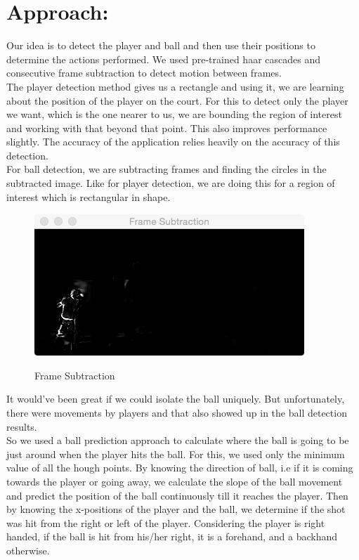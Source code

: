 \documentclass[10.5pt]{proc}
\begin{document}
    \section{Approach:}
	Our idea is to detect the player and ball and then use their positions to determine the actions performed. We used pre-trained haar cascades and consecutive frame subtraction to detect motion between frames.\\
	The player detection method gives us a rectangle and using it, we are learning about the position of the player on the court. For this to detect only the player we want, which is the one nearer to us, we are bounding the region of interest and working with that beyond that point. This also improves performance slightly. The accuracy of the application relies heavily on the accuracy of this detection.\\
	For ball detection, we are subtracting frames and finding the circles in the subtracted image. Like for player detection, we are doing this for a region of interest which is rectangular in shape.\\
    \begin{figure}[h]
    \centering
	\includegraphics[width=.47\textwidth]{hough.png}\\
	\caption{Frame Subtraction}
	\end{figure}
	It would've been great if we could isolate the ball uniquely. But unfortunately, there were movements by players and that also showed up in the ball detection results.\\
	So we used a ball prediction approach to calculate where the ball is going to be just around when the player hits the ball. For this, we used only the minimum value of all the hough points. By knowing the direction of ball, i.e if it is coming towards the player or going away, we calculate the slope of the ball movement and predict the position of the ball continuously till it reaches the player. Then by knowing the x-positions of the player and the ball, we determine if the shot was hit from the right or left of the player. Considering the player is right handed, if the ball is hit from his/her right, it is a forehand, and a backhand otherwise.\\
	
\end{document}
